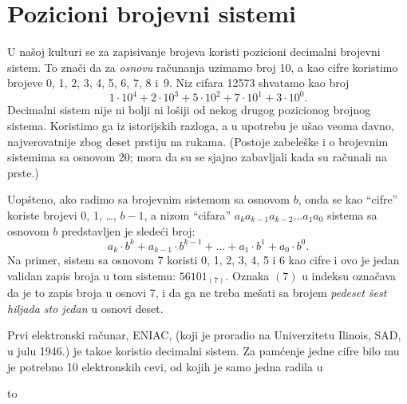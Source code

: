\section{Pozicioni brojevni sistemi}

U na\v soj kulturi se za zapisivanje brojeva koristi pozicioni decimalni brojevni sistem.
To zna\v ci da za \emph{osnovu} ra\v cunanja uzimamo broj 10, a kao cifre koristimo
brojeve 0, 1, 2, 3, 4, 5, 6, 7, 8 i~9. Niz cifara
12573 shvatamo kao broj
$$
    1 \cdot 10^4 + 2 \cdot 10^3 + 5 \cdot 10^2 +
    7 \cdot 10^1 + 3 \cdot 10^0.
$$
Decimalni sistem nije ni bolji ni lo\v siji od nekog drugog
pozicionog brojnog sistema. Koristimo ga iz istorijskih razloga,
a u upotrebu je u\v sao veoma davno, najverovatnije zbog deset
prstiju na rukama. (Postoje zabele\v ske i o brojevnim sistemima sa
osnovom 20; mora da su se sjajno zabavljali kada su ra\v cunali na
prste.)

Uop\v steno, ako radimo sa brojevnim sistemom sa osnovom $b$, onda
se kao \enquote{cifre} koriste brojevi 0, 1, \ldots, $b-1$,
a nizom \enquote{cifara} $a_k a_{k-1} a_{k-2} \ldots a_1 a_0$ sistema
sa osnovom $b$ predstavljen je slede\'ci broj:
$$
    a_k \cdot b^k + a_{k-1} \cdot b^{k-1} + \ldots + a_1 \cdot b^1
    + a_0 \cdot b^0.
$$
Na primer, sistem sa osnovom 7 koristi 0, 1, 2, 3, 4, 5 i 6 kao cifre
i ovo je jedan validan zapis broja u tom sistemu: $56101_{(7)}$.
Oznaka $(7)$ u indeksu ozna\v cava da je to zapis broja u
osnovi 7, i da ga ne treba me\v sati sa brojem \emph{pedeset \v sest hiljada
sto jedan} u osnovi deset.

Prvi elektronski ra\v cunar, ENIAC, (koji je proradio na Univerzitetu
Ilinois, SAD, u julu 1946.) je tako\dj e koristio decimalni sistem.
Za pam\'cenje jedne cifre bilo mu je potrebno 10 elektronskih cevi, od kojih
je samo jedna radila u\break

\kern -2.5mm

\noindent\hbox to 

